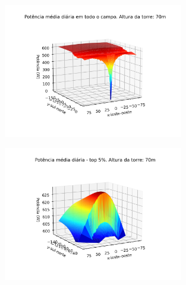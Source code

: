 \documentclass[12pt,notheorems,hyperref={pdfauthor=Professor Rafael Nardi}]{beamer}
\begin{document}
\begin{frame}%
	\begin{figure}[htpb]
		\centering
		\includegraphics[width=0.7\textwidth]{../../plots/tower_shadow_correction/square_grid_along_day_70mfull_grid.png}
		\label{fig:heliost_field_average_60m}
	\end{figure}
\end{frame}

\begin{frame}%
	\begin{figure}[htpb]
		\centering
		\includegraphics[width=0.7\textwidth]{../../plots/tower_shadow_correction/square_grid_along_day_70mtop_5_most_powerfull.png}
		\label{fig:heliost_field_average_60m}
	\end{figure}
\end{frame}
\end{document}
